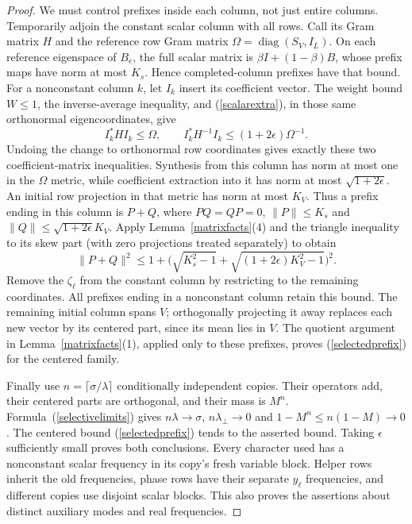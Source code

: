 \documentclass[reqno,a4paper,12pt]{amsart}
\newcommand{\diag}{\operatorname{diag}}
\begin{document}
\begin{proof}
We must control prefixes inside each column, not just entire columns.
Temporarily adjoin the constant scalar column with all rows.
Call its Gram matrix $H$ and the reference row Gram matrix
$\Omega=\diag(S_V,I_L)$.
On each reference eigenspace of $B_e$, the full scalar matrix is
$\beta I+(1-\beta)B$, whose prefix maps have norm at most $K_s$.
Hence completed-column prefixes have that bound.
For a nonconstant column $k$, let $I_k$ insert its coefficient vector.
The weight bound $W\le1$, the inverse-average inequality, and
(\ref{scalarextra}), in those same orthonormal eigencoordinates, give
\[
 I_k^*HI_k\le\Omega,\qquad
 I_k^*H^{-1}I_k\le(1+2\epsilon)\Omega^{-1}.
\]
Undoing the change to orthonormal row coordinates gives exactly these
two coefficient-matrix inequalities. Synthesis from this column has
norm at most one in the $\Omega$ metric, while coefficient extraction
into it has norm at most $\sqrt{1+2\epsilon}$.
An initial row projection in that metric has norm at most $K_V$.
Thus a prefix ending in this column is $P+Q$, where $PQ=QP=0$,
$\|P\|\le K_s$ and $\|Q\|\le\sqrt{1+2\epsilon}K_V$.
Apply Lemma~\ref{matrixfacts}(4) and the triangle inequality to its
skew part (with zero projections treated separately) to obtain
\begin{equation}\label{selectedprefix}
 \|P+Q\|^2\le
 1+\bigl(\sqrt{K_s^2-1}+
 \sqrt{(1+2\epsilon)K_V^2-1}\bigr)^2.
\end{equation}
Remove the $\zeta_\ell$ from the constant column by restricting to the
remaining coordinates. All prefixes ending in a nonconstant column
retain this bound. The remaining initial column spans $V$;
orthogonally projecting it away replaces each new vector by its
centered part, since its mean lies in $V$. The quotient argument in
Lemma~\ref{matrixfacts}(1), applied only to these prefixes, proves
(\ref{selectedprefix}) for the centered family.

Finally use $n=\lceil\sigma/\lambda\rceil$ conditionally independent
copies. Their operators add, their centered parts are orthogonal, and
their mass is $M^n$. Formula~(\ref{selectivelimits}) gives
$n\lambda\to\sigma$, $n\lambda_\perp\to0$ and
$1-M^n\le n(1-M)\to0$.
The centered bound (\ref{selectedprefix}) tends to the asserted bound.
Taking $\epsilon$ sufficiently small proves both conclusions.
Every character used has a nonconstant scalar frequency in its copy's
fresh variable block. Helper rows inherit the old frequencies, phase
rows have their separate $y_\ell$ frequencies, and different copies
use disjoint scalar blocks. This also proves the assertions about
distinct auxiliary modes and real frequencies.
\end{proof}
\end{document}
